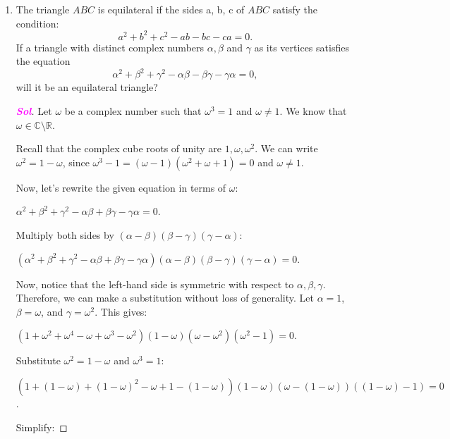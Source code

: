 \documentclass{article}
\theoremstyle{definition}
\newcommand{\sol}{\textcolor{magenta}{\bf Sol}}
\begin{document}
\begin{enumerate}
\begin{proof}[\sol]
\begin{enumerate}
			$\frac{\partial u}{\partial x}(0, 0) = 0 = \frac{\partial v}{\partial y}(0, 0)$
			$\frac{\partial u}{\partial y}(0, 0) = 0 = -\frac{\partial v}{\partial x}(0, 0)$
			As the Cauchy-Riemann equations hold at $z = 0$, we can conclude that the function $f(z)$ is complex differentiable at $z = 0$.
		\end{enumerate}
	\end{proof}
	
	\item The triangle $ABC$ is equilateral if the sides a, b, c of $ABC$ satisfy the condition: \[
	a^2 + b^2 + c^2 - ab - bc - ca = 0.
	\]
	If a triangle with distinct complex numbers $\alpha,\beta$ and $\gamma$ as its vertices satisfies the equation \[
	\alpha^2+\beta^2+\gamma^2-\alpha\beta-\beta\gamma-\gamma\alpha=0,
	\] will it be an equilateral triangle?
	\begin{proof}[\sol]
		Let $\omega$ be a complex number such that $\omega^3 = 1$ and $\omega \neq 1$. We know that $\omega \in \mathbb{C} \setminus \mathbb{R}$.
		
		Recall that the complex cube roots of unity are $1, \omega, \omega^2$. We can write $\omega^2 = 1 - \omega$, since $\omega^3 - 1 = (\omega - 1)(\omega^2 + \omega + 1) = 0$ and $\omega \neq 1$.
		
		Now, let's rewrite the given equation in terms of $\omega$:
		
		$\alpha^2 + \beta^2 + \gamma^2 - \alpha\beta + \beta\gamma - \gamma\alpha = 0$.
		
		Multiply both sides by $(\alpha - \beta)(\beta - \gamma)(\gamma - \alpha)$:
		
		$(\alpha^2 + \beta^2 + \gamma^2 - \alpha\beta + \beta\gamma - \gamma\alpha)(\alpha - \beta)(\beta - \gamma)(\gamma - \alpha) = 0$.
		
		Now, notice that the left-hand side is symmetric with respect to $\alpha, \beta, \gamma$. Therefore, we can make a substitution without loss of generality. Let $\alpha = 1$, $\beta = \omega$, and $\gamma = \omega^2$. This gives:
		
		$(1 + \omega^2 + \omega^4 - \omega + \omega^3 - \omega^2)(1 - \omega)(\omega - \omega^2)(\omega^2 - 1) = 0$.
		
		Substitute $\omega^2 = 1 - \omega$ and $\omega^3 = 1$:
		
		$(1 + (1 - \omega) + (1 - \omega)^2 - \omega + 1 - (1 - \omega))(1 - \omega)(\omega - (1 - \omega))((1 - \omega) - 1) = 0$.
		
		Simplify:
		

\end{proof}
\end{enumerate}
\end{document}
